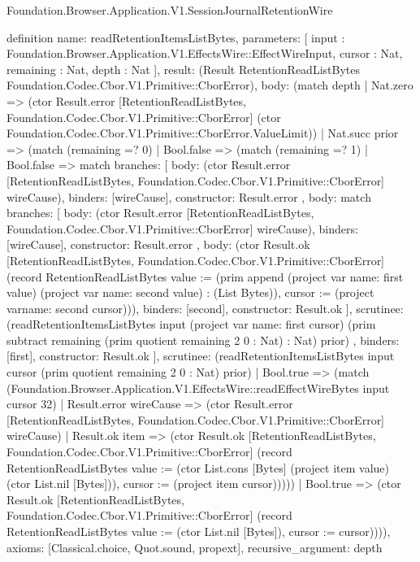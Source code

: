 \begin{lexlean}{Foundation.Browser.Application.V1.SessionJournalRetentionWire}
\begin{semanticmodule}
definition{
  name: readRetentionItemsListBytes,
  parameters: [
    input : Foundation.Browser.Application.V1.EffectsWire::EffectWireInput,
    cursor : Nat,
    remaining : Nat,
    depth : Nat
  ],
  result: (Result RetentionReadListBytes Foundation.Codec.Cbor.V1.Primitive::CborError),
  body: (match depth
    | Nat.zero => (ctor Result.error [RetentionReadListBytes, Foundation.Codec.Cbor.V1.Primitive::CborError] (ctor Foundation.Codec.Cbor.V1.Primitive::CborError.ValueLimit))
    | Nat.succ prior => (match (remaining =? 0)
      | Bool.false => (match (remaining =? 1)
        | Bool.false => match{
          branches: [
            {
              body: (ctor Result.error [RetentionReadListBytes, Foundation.Codec.Cbor.V1.Primitive::CborError] wireCause),
              binders: [wireCause],
              constructor: Result.error
            },
            {
              body: match{
                branches: [
                  {
                    body: (ctor Result.error [RetentionReadListBytes, Foundation.Codec.Cbor.V1.Primitive::CborError] wireCause),
                    binders: [wireCause],
                    constructor: Result.error
                  },
                  {
                    body: (ctor Result.ok [RetentionReadListBytes, Foundation.Codec.Cbor.V1.Primitive::CborError] (record RetentionReadListBytes {value := (prim append (project var{
                      name: first
                    } value) (project var{
                      name: second
                    } value) : (List Bytes)), cursor := (project var{name: second} cursor)})),
                    binders: [second],
                    constructor: Result.ok
                  }
                ],
                scrutinee: (readRetentionItemsListBytes input (project var{
                  name: first
                } cursor) (prim subtract remaining (prim quotient remaining 2 0 : Nat) : Nat) prior)
              },
              binders: [first],
              constructor: Result.ok
            }
          ],
          scrutinee: (readRetentionItemsListBytes input cursor (prim quotient remaining 2 0 : Nat) prior)
        }
        | Bool.true => (match (Foundation.Browser.Application.V1.EffectsWire::readEffectWireBytes input cursor 32)
          | Result.error wireCause => (ctor Result.error [RetentionReadListBytes, Foundation.Codec.Cbor.V1.Primitive::CborError] wireCause)
          | Result.ok item => (ctor Result.ok [RetentionReadListBytes, Foundation.Codec.Cbor.V1.Primitive::CborError] (record RetentionReadListBytes {value := (ctor List.cons [Bytes] (project item value) (ctor List.nil [Bytes])), cursor := (project item cursor)}))))
      | Bool.true => (ctor Result.ok [RetentionReadListBytes, Foundation.Codec.Cbor.V1.Primitive::CborError] (record RetentionReadListBytes {value := (ctor List.nil [Bytes]), cursor := cursor})))),
  axioms: [Classical.choice, Quot.sound, propext],
  recursive_argument: depth
}


\end{semanticmodule}
\end{lexlean}
